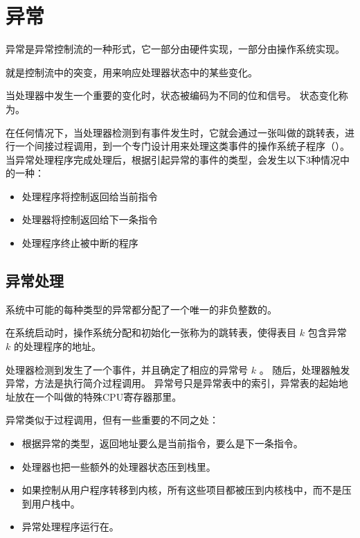 
\section{异常}
{
    异常是异常控制流的一种形式，它一部分由硬件实现，一部分由操作系统实现。

    就是控制流中的突变，用来响应处理器状态中的某些变化。

    当处理器中发生一个重要的变化时，状态被编码为不同的位和信号。
    状态变化称为。

    在任何情况下，当处理器检测到有事件发生时，它就会通过一张叫做的跳转表，进行一个间接过程调用，到一个专门设计用来处理这类事件的操作系统子程序（）。
    当异常处理程序完成处理后，根据引起异常的事件的类型，会发生以下3种情况中的一种：

    \begin{itemize}
        \item 处理程序将控制返回给当前指令
        \item 处理器将控制返回给下一条指令
        \item 处理程序终止被中断的程序
    \end{itemize}

    \subsection{异常处理}
    {
        系统中可能的每种类型的异常都分配了一个唯一的非负整数的。

        在系统启动时，操作系统分配和初始化一张称为的跳转表，使得表目 $k$ 包含异常 $k$ 的处理程序的地址。

        处理器检测到发生了一个事件，并且确定了相应的异常号 $k$ 。
        随后，处理器触发异常，方法是执行简介过程调用。
        异常号只是异常表中的索引，异常表的起始地址放在一个叫做的特殊CPU寄存器那里。

        异常类似于过程调用，但有一些重要的不同之处：

        \begin{itemize}
            \item 根据异常的类型，返回地址要么是当前指令，要么是下一条指令。
            \item 处理器也把一些额外的处理器状态压到栈里。
            \item 如果控制从用户程序转移到内核，所有这些项目都被压到内核栈中，而不是压到用户栈中。
            \item 异常处理程序运行在。
        \end{itemize}
    }

}
